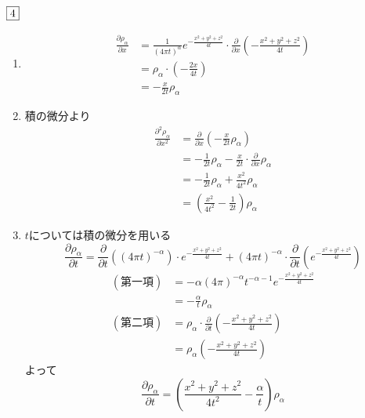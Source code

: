 \documentclass[dvipdfmx]{jsreport}
\newcounter{num}[section]
\begin{document}
\begin{answer} %
	$\fbox{4}$
\begin{enumerate}
	\item 
\begin{align*}
	\frac{\partial \rho_\alpha}{\partial x}
	&= \frac{1}{(4\pi t)^\alpha}e^{-\frac{x^2+ y^2+ z^2}{4t}}\cdot \frac{\partial}{\partial x}\left(-\frac{x^2+ y^2+ z^2}{4t}\right)\\
	&= \rho_\alpha\cdot\left(-\frac{2x}{4t}\right)\\
	&= -\frac{x}{2t}\rho_\alpha
\end{align*}

	\item 積の微分より
\begin{align*}
	\frac{\partial^2 \rho_\alpha}{\partial x^2}
	&= \frac{\partial}{\partial x}\left(-\frac{x}{2t}\rho_\alpha\right)\\
	&= -\frac{1}{2t}\rho_\alpha- \frac{x}{2t}\cdot \frac{\partial}{\partial x}\rho_\alpha\\
	&= -\frac{1}{2t}\rho_\alpha+ \frac{x^2}{4t^2}\rho_\alpha\\
	&= \left(\frac{x^2}{4t^2}- \frac{1}{2t}\right)\rho_\alpha
\end{align*}

	\item $t$については積の微分を用いる
\begin{equation*}
	\frac{\partial \rho_\alpha}{\partial t}
	= \frac{\partial}{\partial t}((4\pi t)^{-\alpha})\cdot e^{-\frac{x^2+ y^2+ z^2}{4t}}+ (4\pi t)^{-\alpha}\cdot \frac{\partial}{\partial t}\left(e^{-\frac{x^2+ y^2+ z^2}{4t}}\right)
\end{equation*}
\begin{align*}
	(第一項)
	&= -\alpha(4\pi)^{-\alpha}t^{-\alpha- 1}e^{-\frac{x^2+ y^2+ z^2}{4t}}\\
	&= -\frac{\alpha}{t}\rho_\alpha\\
	(第二項)
	&= \rho_\alpha\cdot \frac{\partial}{\partial t}\left({-\frac{x^2+ y^2+ z^2}{4t}}\right)\\
	&= \rho_\alpha\left({-\frac{x^2+ y^2+ z^2}{4t}}\right)
\end{align*}
	よって
\begin{equation*}
	\frac{\partial \rho_\alpha}{\partial t}= \left(\frac{x^2+ y^2+ z^2}{4t^2}- \frac{\alpha}{t}\right)\rho_\alpha
\end{equation*}


\end{enumerate}
\end{answer}
\end{document}
